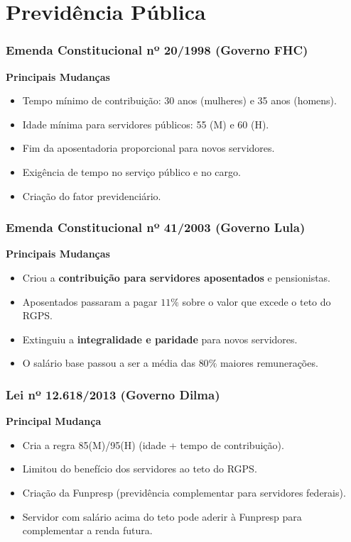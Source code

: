 \section{Previdência Pública}

\begin{frame}[c]\frametitle{Emenda Constitucional nº 20/1998 (Governo FHC)}
  \textbf{Principais Mudanças}
  \begin{itemize}
    \item Tempo mínimo de contribuição: 30 anos (mulheres) e 35 anos (homens).
    \item Idade mínima para servidores públicos: 55 (M) e 60 (H).
    \item Fim da aposentadoria proporcional para novos servidores.
    \item Exigência de tempo no serviço público e no cargo.
    \item Criação do fator previdenciário.
  \end{itemize}
\end{frame}

\begin{frame}[c]\frametitle{Emenda Constitucional nº 41/2003 (Governo Lula)}
  \textbf{Principais Mudanças}
  \begin{itemize}
    \item Criou a \textbf{contribuição para servidores aposentados} e pensionistas.
    \item Aposentados passaram  a pagar $11\%$  sobre o valor que excede o teto do RGPS.
    \item Extinguiu a \textbf{integralidade e paridade} para novos servidores.
    \item O salário base passou a ser a média das $80\%$ maiores remunerações.
  \end{itemize}
\end{frame}

\begin{frame}[c]\frametitle{Lei nº 12.618/2013 (Governo Dilma)}
  \textbf{Principal Mudança}
  \begin{itemize}
    \item Cria a regra 85(M)/95(H) (idade + tempo de contribuição).
    \item Limitou do benefício dos servidores ao teto do RGPS.
    \item Criação da Funpresp (previdência complementar para servidores federais).
    \item Servidor com salário acima do teto pode aderir à Funpresp para complementar a renda futura.
  \end{itemize}
\end{frame}

